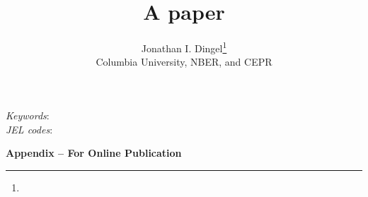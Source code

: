 \documentclass[11pt]{article}
\title{A paper}
\author{Jonathan I. Dingel\thanks{\dingelemail} \\ Columbia University, NBER, and CEPR}
\date{\monthname[\the\month] \the\year}
\begin{document}



\begin{abstract}
\end{abstract}
\vspace{1cm}
{\small
\noindent \textit{Keywords}:  \\
\textit{JEL codes}: 
}
\thispagestyle{empty}
\newpage
\setcounter{page}{1}


%
%
%
%


{}

\newpage
\clearpage

\begin{center} \Large \textbf{Appendix -- For Online Publication} \end{center}
\appendix
{}

%
%
%
\end{document}
